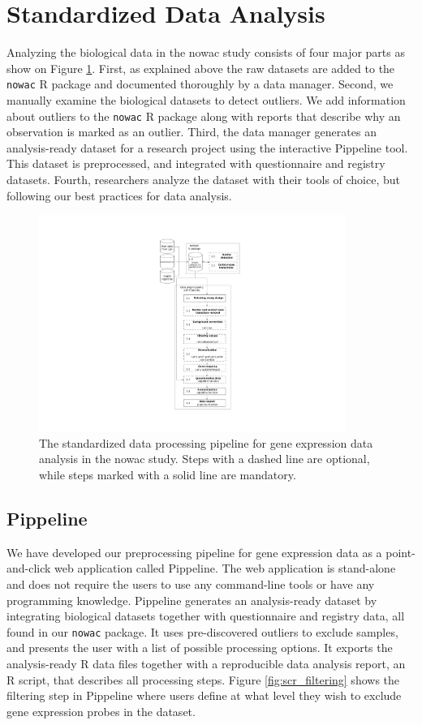 \section{Standardized Data Analysis}
Analyzing the biological data in the \gls{nowac} study consists of four major
parts as show on Figure \ref{fig:uit_pippeline}. First, as explained above the
raw datasets are added to the \texttt{nowac} R package and documented thoroughly
by a data manager.  Second, we manually examine the biological datasets to
detect outliers. We add information about outliers to the \texttt{nowac} R
package along with reports that describe why an observation is marked as an
outlier.  Third, the data manager generates an analysis-ready dataset for a
research project using the interactive Pippeline tool. This dataset is
preprocessed, and integrated with questionnaire and registry datasets. Fourth,
researchers analyze the dataset with their tools of choice, but following
our best practices for data analysis.

\begin{figure}
    \centering
    \includegraphics[width=10cm]{figures/uit_pippeline_rm_refs.pdf}
    \caption[Standardized data processing pipeline]{The standardized data
    processing pipeline for gene expression data analysis in the \gls{nowac}
    study. Steps with a dashed line are optional, while steps marked with a
    solid line are mandatory.}
    \label{fig:uit_pippeline}
\end{figure}


\subsection{Pippeline} 
We have developed our preprocessing pipeline for gene expression data as a
point-and-click web application called Pippeline. The web application is
stand-alone and does not require the users to use any command-line tools or have
any programming knowledge. Pippeline generates an analysis-ready dataset by
integrating biological datasets together with questionnaire and registry data,
all found in our \texttt{nowac} package. It uses pre-discovered outliers to
exclude samples, and presents the user with a list of possible processing
options. It exports the analysis-ready R data files together with a reproducible
data analysis report, an R script, that describes all processing steps.  Figure
\ref{fig:scr_filtering} shows the filtering step in Pippeline where users define
at what level they wish to exclude gene expression probes in the dataset. 

